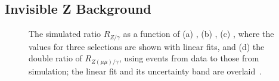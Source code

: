 \subsection{Invisible Z Background}
\label{subsec:RA2_Zinv}
\begin{figure}[!t]
  \centering
{}
  \caption{The simulated ratio $R_{Z/\gamma}$ as a function of (a) \MHT, (b) \HT, (c) \NJets, where the values for three \MHT selections are shown with linear fits, and (d) the double ratio of $R_{Z(\mu\mu)/\gamma}$, using events from data to those from simulation; the linear fit and its uncertainty band are overlaid~\cite{Chatrchyan:2014lfa}.}
  \label{fig:ra2_zinv}
\end{figure}
